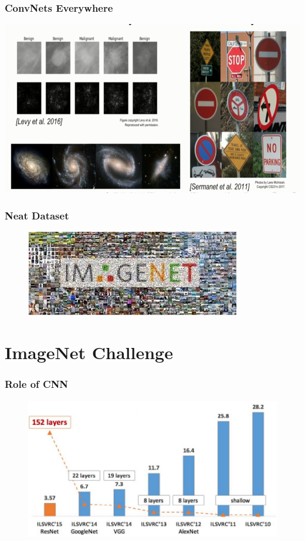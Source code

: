 \documentclass{beamer}
\begin{document}
\begin{frame}
\frametitle{ConvNets Everywhere}
\centering
\includegraphics[width=0.9\linewidth]{Pics/ex5.PNG}
\end{frame}


\begin{frame}
	\frametitle{Neat Dataset}
	\begin{figure}
		\includegraphics[width=\linewidth]{Pics/image_net.jpeg}
	\end{figure}
\end{frame}

\section{ImageNet Challenge}
\begin{frame}
\frametitle{Role of CNN}
\begin{figure}
	\includegraphics[width=\linewidth]{Pics/imagenet_acc.png}
\end{figure}
\end{frame}
\end{document}
